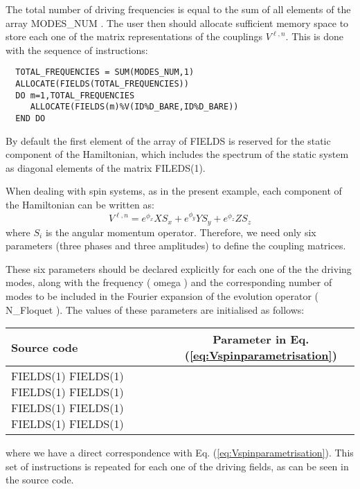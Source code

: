 \documentclass[10pt,a4paper]{article}
\begin{document}
The total number of driving frequencies is equal to the sum of all elements of the array   MODES\_NUM . The user then should allocate sufficient memory space to store each one of the matrix representations of the couplings $V^{\ell,n}$. This is done with the sequence of instructions:

\begin{verbatim}
  TOTAL_FREQUENCIES = SUM(MODES_NUM,1)
  ALLOCATE(FIELDS(TOTAL_FREQUENCIES))
  DO m=1,TOTAL_FREQUENCIES
     ALLOCATE(FIELDS(m)%V(ID%D_BARE,ID%D_BARE))
  END DO
\end{verbatim}

By default the first element of the array of   FIELDS   is reserved for the static component of the Hamiltonian, which includes the spectrum of the static system as diagonal elements of the matrix   FILEDS(1).

When dealing with spin systems, as in the present example, each component of the Hamiltonian can be written as:
\begin{equation}
V^{\ell,n} = e^{\phi_x} X S_x + e^{\phi_y} Y S_y + e^{\phi_z} Z S_z
\label{eq:Vspinparametrisation}
\end{equation}
where $S_i$ is the angular momentum operator. Therefore, we need only six parameters (three phases and three amplitudes) to define the coupling matrices. 

These six parameters should be declared explicitly for each one of the the driving modes, along with the frequency (   omega  )  and the corresponding number of modes to be included in the Fourier expansion of the evolution operator (  N\_Floquet ). The values of these parameters are initialised as follows:
\begin{center}
  \begin{tabular}{ |l | c | }
    \hline
    Source code & Parameter in Eq. (\ref{eq:Vspinparametrisation}) \\ \hline
      FIELDS(1)%
      FIELDS(1)%
      FIELDS(1)%
      FIELDS(1)%
      FIELDS(1)%
      FIELDS(1)%
      FIELDS(1)%
      FIELDS(1)%
    \hline
  \end{tabular}
\end{center}
where we have a direct correspondence with Eq. (\ref{eq:Vspinparametrisation}). This set of instructions is repeated for each one of the driving fields, as can be seen in the source code.
\end{document}
